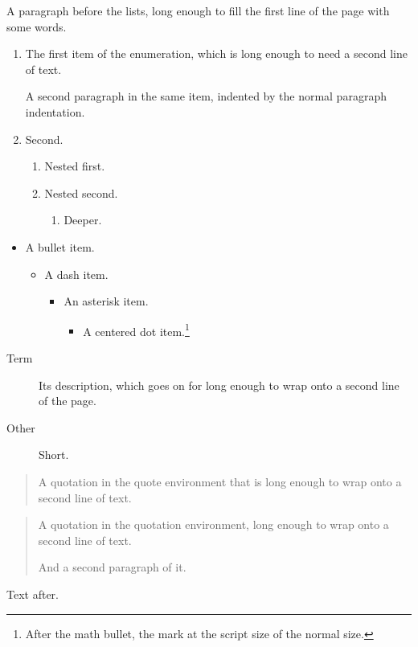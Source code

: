 \documentclass{amsart}
\begin{document}
A paragraph before the lists, long enough to fill the first line of the page with some words.
\begin{enumerate}
\item The first item of the enumeration, which is long enough to need a second line of text.

A second paragraph in the same item, indented by the normal paragraph indentation.
\item Second.
\begin{enumerate}
\item Nested first.
\item Nested second.
\begin{enumerate}
\item Deeper.
\end{enumerate}
\end{enumerate}
\end{enumerate}
\begin{itemize}
\item A bullet item.
\begin{itemize}
\item A dash item.
\begin{itemize}
\item An asterisk item.
\begin{itemize}
\item A centered dot item.\footnote{After the math bullet, the mark at the script size of the normal size.}
\end{itemize}
\end{itemize}
\end{itemize}
\end{itemize}
\begin{description}
\item[Term] Its description, which goes on for long enough to wrap onto a second line of the page.
\item[Other] Short.
\end{description}
\begin{quote}
A quotation in the quote environment that is long enough to wrap onto a second line of text.
\end{quote}
\begin{quotation}
A quotation in the quotation environment, long enough to wrap onto a second line of text.

And a second paragraph of it.
\end{quotation}
Text after.
\end{document}
